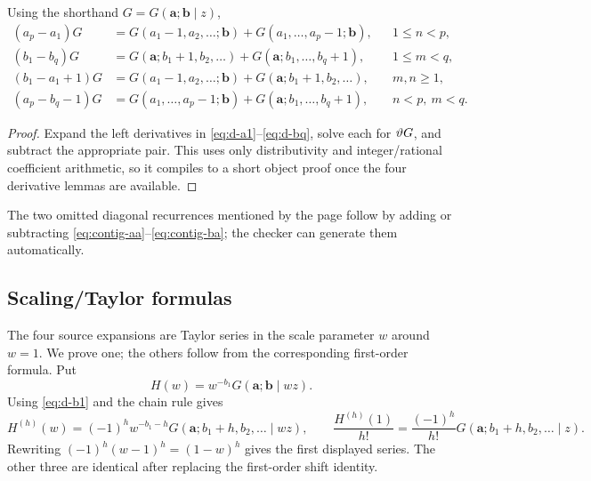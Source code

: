 \begin{theorem}\label{thm:contiguous}
Using the shorthand $G=G(\mathbf a;\mathbf b\mid z)$,
\begin{align}
(a_p-a_1)G
&=G(a_1-1,a_2,\ldots;\mathbf b)
 +G(a_1,\ldots,a_p-1;\mathbf b),&&1\le n<p,
\label{eq:contig-aa}\\
(b_1-b_q)G
&=G(\mathbf a;b_1+1,b_2,\ldots)
 +G(\mathbf a;b_1,\ldots,b_q+1),&&1\le m<q,
\label{eq:contig-bb}\\
(b_1-a_1+1)G
&=G(a_1-1,a_2,\ldots;\mathbf b)
 +G(\mathbf a;b_1+1,b_2,\ldots),&&m,n\ge1,
\label{eq:contig-ab}\\
(a_p-b_q-1)G
&=G(a_1,\ldots,a_p-1;\mathbf b)
 +G(\mathbf a;b_1,\ldots,b_q+1),&&n<p,\ m<q.
\label{eq:contig-ba}
\end{align}
\end{theorem}
\begin{proof}
Expand the left derivatives in \eqref{eq:d-a1}--\eqref{eq:d-bq}, solve each for
$\vartheta G$, and subtract the appropriate pair.  This uses only distributivity
and integer/rational coefficient arithmetic, so it compiles to a short object
proof once the four derivative lemmas are available.
\end{proof}

The two omitted diagonal recurrences mentioned by the page follow by adding or
subtracting \eqref{eq:contig-aa}--\eqref{eq:contig-ba}; the checker can generate
them automatically.

\subsection{Scaling/Taylor formulas}

The four source expansions are Taylor series in the scale parameter $w$ around
$w=1$.  We prove one; the others follow from the corresponding first-order
formula.  Put
\[
 H(w)=w^{-b_1}G(\mathbf a;\mathbf b\mid wz).
\]
Using \eqref{eq:d-b1} and the chain rule gives
\[
 H^{(h)}(w)=(-1)^h w^{-b_1-h}
 G(\mathbf a;b_1+h,b_2,\ldots\mid wz),
 \qquad
 \frac{H^{(h)}(1)}{h!}
 =\frac{(-1)^h}{h!}G(\mathbf a;b_1+h,b_2,\ldots\mid z).
\]
Rewriting $(-1)^h(w-1)^h=(1-w)^h$ gives the first displayed
series.  The other three are identical after replacing the first-order shift
identity.


